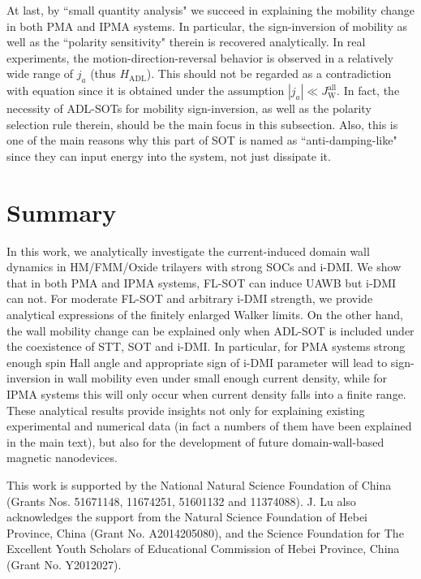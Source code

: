 \documentclass[12pt]{iopart}
\begin{document}
At last, by ``small quantity analysis" we succeed in explaining
the mobility change in both PMA and IPMA systems. 
In particular, the sign-inversion of mobility
as well as the ``polarity sensitivity" therein is recovered analytically.
In real experiments, the motion-direction-reversal behavior is observed
in a relatively wide range of $j_a$ (thus $H_{\mathrm{ADL}}$).
This should not be regarded as a contradiction with equation 
since it is obtained under the assumption $|j_a|\ll J_{\mathrm{W}}^{\mathrm{all}}$.
In fact, the necessity of ADL-SOTs for mobility sign-inversion,
as well as the polarity selection rule therein, should be the main focus in this subsection.
Also, this is one of the main reasons why this part of SOT is named as ``anti-damping-like"
since they can input energy into the system, not just dissipate it.



\section{Summary}
In this work, we analytically investigate the current-induced domain wall dynamics
in HM/FMM/Oxide trilayers with strong SOCs and i-DMI.
We show that in both PMA and IPMA systems,
FL-SOT can induce UAWB but i-DMI can not.
For moderate FL-SOT and arbitrary i-DMI strength, 
we provide analytical expressions of the finitely enlarged Walker limits.
On the other hand, the wall mobility change can be explained only when
ADL-SOT is included under the coexistence of STT, SOT and i-DMI.
In particular, for PMA systems strong enough spin Hall angle and appropriate sign of 
i-DMI parameter will lead to sign-inversion in wall mobility even under small enough current density,
while for IPMA systems this will only occur when current density falls into a finite range.
These analytical results provide insights not only for explaining existing experimental and numerical
data (in fact a numbers of them have been explained in the main text),
but also for the development of future domain-wall-based magnetic nanodevices.




\ack
This work is supported by the National Natural Science Foundation of
China (Grants Nos. 51671148, 11674251, 51601132 and 11374088).
J. Lu also acknowledges the support from the Natural Science Foundation
of Hebei Province, China (Grant No. A2014205080),
and the Science Foundation for The Excellent Youth Scholars of Educational Commission of Hebei Province,
China (Grant No. Y2012027).
\end{document}
